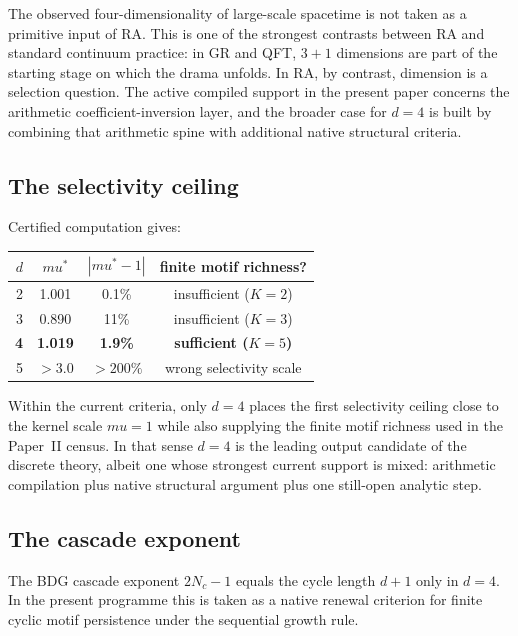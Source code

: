 \documentclass[11pt]{article}
\def\mu{mu}%
\begin{document}
The observed four-dimensionality of large-scale spacetime is not taken as a primitive input of RA. This is one of the strongest contrasts between RA and standard continuum practice: in GR and QFT, $3+1$ dimensions are part of the starting stage on which the drama unfolds. In RA, by contrast, dimension is a selection question. The active compiled support in the present paper concerns the arithmetic coefficient-inversion layer, and the broader case for $d=4$ is built by combining that arithmetic spine with additional native structural criteria.

\subsection{The selectivity ceiling}

Certified computation gives:
\begin{center}
\begin{tabular}{rccc}
\toprule
$d$ & $\mu^*$ & $|\mu^*-1|$ & finite motif richness? \\
\midrule
2 & 1.001 & 0.1\% & insufficient ($K=2$) \\
3 & 0.890 & 11\% & insufficient ($K=3$) \\
\textbf{4} & \textbf{1.019} & \textbf{1.9\%} & \textbf{sufficient ($K=5$)} \\
5 & $>3.0$ & $>200\%$ & wrong selectivity scale \\
\bottomrule
\end{tabular}
\end{center}

Within the current criteria, only $d=4$ places the first selectivity ceiling close to the kernel scale $\mu=1$ while also supplying the finite motif richness used in the Paper~II census. In that sense $d=4$ is the leading output candidate of the discrete theory, albeit one whose strongest current support is mixed: arithmetic compilation plus native structural argument plus one still-open analytic step.

\subsection{The cascade exponent}

The BDG cascade exponent $2N_c-1$ equals the cycle length $d+1$ only in $d=4$. In the present programme this is taken as a native renewal criterion for finite cyclic motif persistence under the sequential growth rule.

\end{document}
